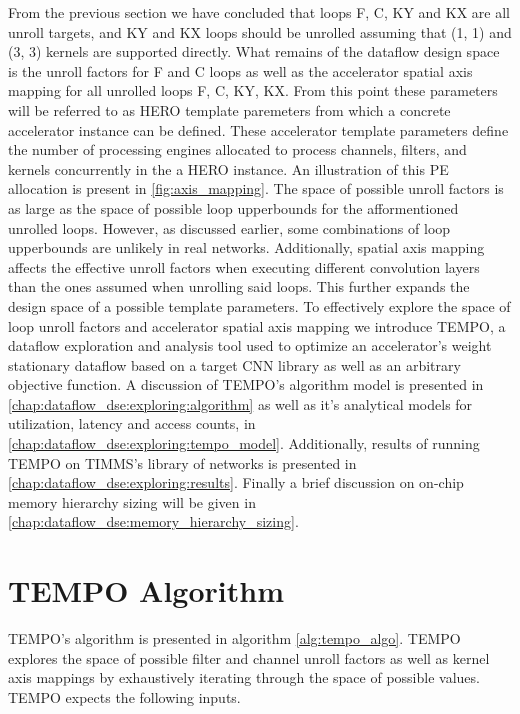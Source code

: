From the previous section we have concluded that loops F, C, KY and KX are all
unroll targets, and KY and KX loops should be unrolled assuming that (1, 1) and (3, 3)
kernels are supported directly. What remains of the dataflow design space is the unroll factors for F
and C loops as well as the accelerator spatial axis mapping for all unrolled
loops F, C, KY, KX. From this point these parameters will be referred to as
HERO template paremeters from which a concrete accelerator instance can
be defined. These accelerator template parameters define the number of
processing engines allocated to process channels, filters, and kernels
concurrently in the a HERO instance. An illustration of this \ac{PE}
allocation is present in \autoref{fig:axis_mapping}. The space of possible
unroll factors is as large as the space of possible loop upperbounds for the
afformentioned unrolled loops. However, as discussed earlier, some combinations
of loop upperbounds are unlikely in real networks. Additionally, spatial axis
mapping affects the effective unroll factors when executing different
convolution layers than the ones assumed when unrolling said loops. This further
expands the design space of a possible template parameters. To
effectively explore the space of loop unroll factors and accelerator spatial
axis mapping we introduce \ac{TEMPO}, a dataflow exploration and analysis tool
used to optimize an accelerator's weight stationary dataflow based on a target
CNN library as well as an arbitrary objective function. A discussion of
\ac{TEMPO}'s algorithm model is presented in
\autoref{chap:dataflow_dse:exploring:algorithm} as well as it's analytical models
for utilization, latency and access counts, in \autoref{chap:dataflow_dse:exploring:tempo_model}. Additionally, results
of running \ac{TEMPO} on TIMMS's library of networks is presented in
\autoref{chap:dataflow_dse:exploring:results}. Finally a brief discussion on
on-chip memory hierarchy sizing will be given in
\autoref{chap:dataflow_dse:memory_hierarchy_sizing}. 

\section{TEMPO Algorithm}
\label{chap:dataflow_dse:exploring:algorithm}

TEMPO's algorithm is presented in algorithm \ref{alg:tempo_algo}. TEMPO explores the
space of possible filter and channel unroll factors as well as kernel axis
mappings by exhaustively iterating through the space of possible values. TEMPO
expects the following inputs. 


